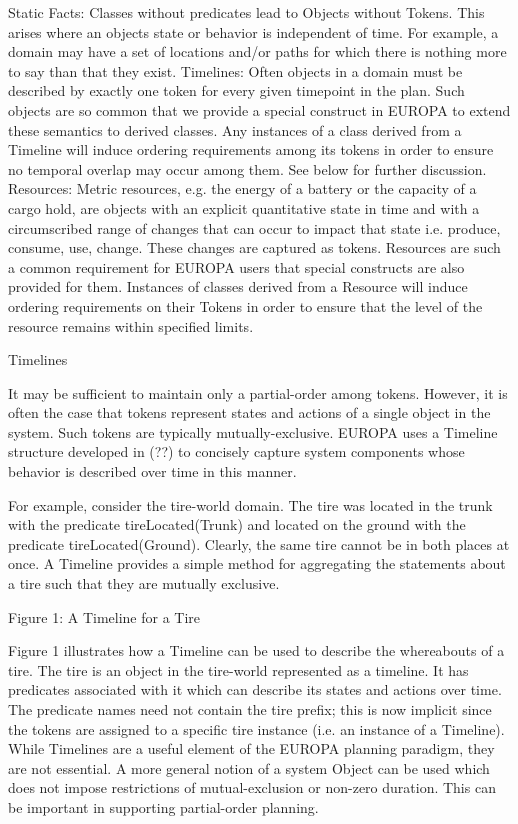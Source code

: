     Static Facts: Classes without predicates lead to Objects without Tokens. This arises where an objects state or behavior is independent of time. For example, a domain may have a set of locations and/or paths for which there is nothing more to say than that they exist.
    Timelines: Often objects in a domain must be described by exactly one token for every given timepoint in the plan. Such objects are so common that we provide a special construct in EUROPA to extend these semantics to derived classes. Any instances of a class derived from a Timeline will induce ordering requirements among its tokens in order to ensure no temporal overlap may occur among them. See below for further discussion.
    Resources: Metric resources, e.g. the energy of a battery or the capacity of a cargo hold, are objects with an explicit quantitative state in time and with a circumscribed range of changes that can occur to impact that state i.e. produce, consume, use, change. These changes are captured as tokens. Resources are such a common requirement for EUROPA users that special constructs are also provided for them. Instances of classes derived from a Resource will induce ordering requirements on their Tokens in order to ensure that the level of the resource remains within specified limits. 

Timelines

It may be sufficient to maintain only a partial-order among tokens. However, it is often the case that tokens represent states and actions of a single object in the system. Such tokens are typically mutually-exclusive. EUROPA uses a Timeline structure developed in (??) to concisely capture system components whose behavior is described over time in this manner.

For example, consider the tire-world domain. The tire was located in the trunk with the predicate tireLocated(Trunk) and located on the ground with the predicate tireLocated(Ground). Clearly, the same tire cannot be in both places at once. A Timeline provides a simple method for aggregating the statements about a tire such that they are mutually exclusive.

Figure 1: A Timeline for a Tire

Figure 1 illustrates how a Timeline can be used to describe the whereabouts of a tire. The tire is an object in the tire-world represented as a timeline. It has predicates associated with it which can describe its states and actions over time. The predicate names need not contain the tire prefix; this is now implicit since the tokens are assigned to a specific tire instance (i.e. an instance of a Timeline). While Timelines are a useful element of the EUROPA planning paradigm, they are not essential. A more general notion of a system Object can be used which does not impose restrictions of mutual-exclusion or non-zero duration. This can be important in supporting partial-order planning.

